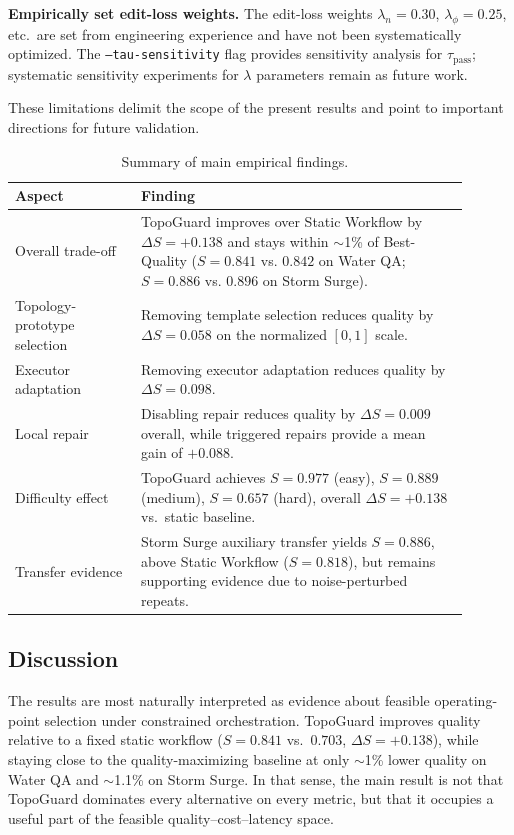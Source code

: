 \documentclass[manuscript,review,anonymous]{acmart}
\begin{document}
\textbf{Empirically set edit-loss weights.} The edit-loss weights $\lambda_n=0.30$, $\lambda_\phi=0.25$, etc.\ are set from engineering experience and have not been systematically optimized. The \texttt{--tau-sensitivity} flag provides sensitivity analysis for $\tau_{\text{pass}}$; systematic sensitivity experiments for $\lambda$ parameters remain as future work.

These limitations delimit the scope of the present results and point to important directions for future validation.


\begin{table}[t]
\centering
\caption{Summary of main empirical findings.}
\label{tab:summary_findings}
\small
\begin{tabular}{p{0.25\linewidth}p{0.65\linewidth}}
\toprule
\textbf{Aspect} & \textbf{Finding} \\
\midrule
Overall trade-off & TopoGuard improves over Static Workflow by $\Delta S=+0.138$ and stays within $\sim$1\% of Best-Quality ($S=0.841$ vs. $0.842$ on Water QA; $S=0.886$ vs. $0.896$ on Storm Surge). \\
Topology-prototype selection & Removing template selection reduces quality by $\Delta S=0.058$ on the normalized $[0,1]$ scale. \\
Executor adaptation & Removing executor adaptation reduces quality by $\Delta S=0.098$. \\
Local repair & Disabling repair reduces quality by $\Delta S=0.009$ overall, while triggered repairs provide a mean gain of $+0.088$. \\
Difficulty effect & TopoGuard achieves $S=0.977$ (easy), $S=0.889$ (medium), $S=0.657$ (hard), overall $\Delta S=+0.138$ vs.\ static baseline. \\
Transfer evidence & Storm Surge auxiliary transfer yields $S=0.886$, above Static Workflow ($S=0.818$), but remains supporting evidence due to noise-perturbed repeats. \\
\bottomrule
\end{tabular}
\end{table}

\subsection{Discussion}
\label{subsec:discussion}

The results are most naturally interpreted as evidence about feasible operating-point selection under constrained orchestration. TopoGuard improves quality relative to a fixed static workflow ($S=0.841$ vs.\ $0.703$, $\Delta S=+0.138$), while staying close to the quality-maximizing baseline at only $\sim$1\% lower quality on Water QA and $\sim$1.1\% on Storm Surge. In that sense, the main result is not that TopoGuard dominates every alternative on every metric, but that it occupies a useful part of the feasible quality--cost--latency space.
\end{document}
